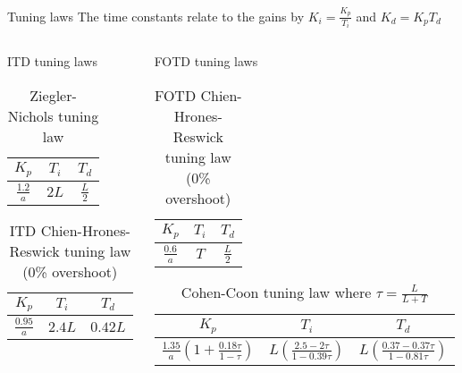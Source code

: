 \documentclass[9pt]{beamer-control}
\begin{document}
\begin{frame}{Tuning laws}
	\centering
	The time constants relate to the gains by $K_i= \frac{K_p}{T_i}$ and $K_d = K_p T_d$\\
	\vfill
	
	\begin{columns}
		\begin{column}{0.5\textwidth}
			ITD tuning laws
			\begin{table}
				\centering
				\begin{tabular}{|c|c|c|}
					\hline
					$K_p$ & $T_i$ & $T_d$\\
					\hline
					$\frac{1.2}{a}$ & $2L$ & $\frac{L}{2}$\\
					\hline	
				\end{tabular}
				\caption{Ziegler-Nichols tuning law}
			\end{table}
			
			\begin{table}
				\centering
				\begin{tabular}{|c|c|c|}
					\hline
					$K_p$ & $T_i$ & $T_d$\\
					\hline
					$\frac{0.95}{a}$ & $2.4 L$ & $0.42 L$\\
					\hline	
				\end{tabular}
				\caption{ITD Chien-Hrones-Reswick tuning law (0\% overshoot)}
			\end{table}
		\end{column}
		\begin{column}{0.5\textwidth} 
			
			FOTD tuning laws
			\begin{table}
				\centering
				\begin{tabular}{|c|c|c|}
					\hline
					$K_p$ & $T_i$ & $T_d$\\
					\hline
					$\frac{0.6}{a}$ & $T$ & $\frac{L}{2}$\\
					\hline	
				\end{tabular}
				\caption{FOTD Chien-Hrones-Reswick tuning law (0\% overshoot)}
			\end{table}
			
			\begin{table}
				\centering
				\begin{tabular}{|c|c|c|}
					\hline
					$K_p$ & $T_i$ & $T_d$\\
					\hline
					\tiny{$\frac{1.35}{a}\left(1 + \frac{0.18 \tau}{1-\tau} \right)$} & \tiny{$ L\left( \frac{2.5-2\tau}{1-0.39\tau} \right) $} & \tiny{$L \left( \frac{0.37-0.37\tau}{1-0.81\tau} \right)$}\\
					\hline	
				\end{tabular}
				\caption{Cohen-Coon tuning law where $\tau=\frac{L}{L+T}$}
			\end{table}
		\end{column}
	\end{columns}
	
	
\end{frame}
\end{document}
